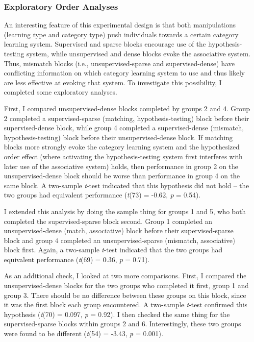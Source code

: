 \subsubsection{Exploratory Order Analyses}
An interesting feature of this experimental design is that both manipulations (learning type and category type) push individuals towards a certain category learning system. Supervised and sparse blocks encourage use of the hypothesis-testing system, while unsupervised and dense blocks evoke the associative system. Thus, mismatch blocks (i.e., unsupervised-sparse and supervised-dense) have conflicting information on which category learning system to use and thus likely are less effective at evoking that system. To investigate this possibility, I completed some exploratory analyses.\par
	First, I compared unsupervised-dense blocks completed by groups 2 and 4. Group 2 completed a supervised-sparse (matching, hypothesis-testing) block before their supervised-dense block, while group 4 completed a supervised-dense (mismatch, hypothesis-testing) block before their unsupervised-dense block. If matching blocks more strongly evoke the category learning system and the hypothesized order effect (where activating the hypothesis-testing system first interferes with later use of the associative system) holds, then performance in group 2 on the unsupervised-dense block should be worse than performance in group 4 on the same block. A two-sample \textit{t}-test indicated that this hypothesis did not hold -- the two groups had equivalent performance (\textit{t}(73) = -0.62, \textit{p} = 0.54).\par
	I extended this analysis by doing the sample thing for groups 1 and 5, who both completed the supervised-sparse block second. Group 1 completed an unsupervised-dense (match, associative) block before their supervised-sparse block and group 4 completed an unsupervised-sparse (mismatch, associative) block first. Again, a two-sample \textit{t}-test indicated that the two groups had equivalent performance (\textit{t}(69) = 0.36, \textit{p} = 0.71). \par
	As an additional check, I looked at two more comparisons. First, I compared the unsupervised-dense blocks for the two groups who completed it first, group 1 and group 3. There should be no difference between these groups on this block, since it was the first block each group encountered. A two-sample \textit{t}-test confirmed this hypothesis (\textit{t}(70) = 0.097, \textit{p} = 0.92). I then checked the same thing for the supervised-sparse blocks within groups 2 and 6. Interestingly, these two groups were found to be different (\textit{t}(54) = -3.43, \textit{p} = 0.001).